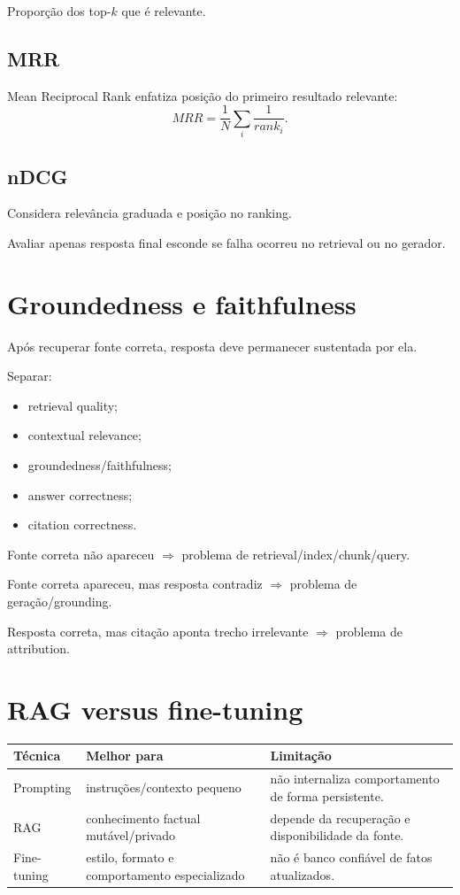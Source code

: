 Proporção dos top-$k$ que é relevante.

\subsection{MRR}

Mean Reciprocal Rank enfatiza posição do primeiro resultado relevante:
\[
MRR=\frac{1}{N}\sum_i\frac{1}{rank_i}.
\]

\subsection{nDCG}

Considera relevância graduada e posição no ranking.

Avaliar apenas resposta final esconde se falha ocorreu no retrieval ou no gerador.

\section{Groundedness e faithfulness}

Após recuperar fonte correta, resposta deve permanecer sustentada por ela.

Separar:
\begin{itemize}
\item retrieval quality;
\item contextual relevance;
\item groundedness/faithfulness;
\item answer correctness;
\item citation correctness.
\end{itemize}

\begin{exemplo}
Fonte correta não apareceu $\Rightarrow$ problema de retrieval/index/chunk/query.

Fonte correta apareceu, mas resposta contradiz $\Rightarrow$ problema de geração/grounding.

Resposta correta, mas citação aponta trecho irrelevante $\Rightarrow$ problema de attribution.
\end{exemplo}

\section{RAG versus fine-tuning}

\begin{table}[ht]
\centering
\small
\begin{tabularx}{\textwidth}{l X X}
\toprule
Técnica & Melhor para & Limitação \\
\midrule
Prompting & instruções/contexto pequeno & não internaliza comportamento de forma persistente. \\
RAG & conhecimento factual mutável/privado & depende da recuperação e disponibilidade da fonte. \\
Fine-tuning & estilo, formato e comportamento especializado & não é banco confiável de fatos atualizados. \\
\bottomrule
\end{tabularx}
\end{table}

